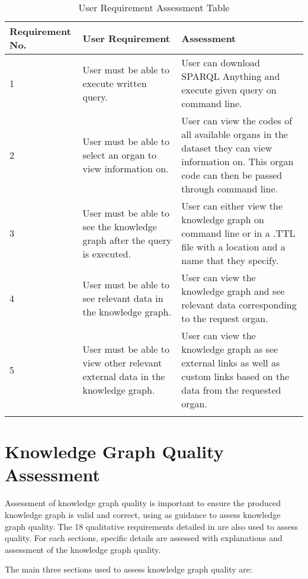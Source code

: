 \begin{longtable}{|p{2.25cm}|p{4.5cm}|p{6.5cm}|}
\hline
\textbf{Requirement No.} & \textbf{User Requirement} & \textbf{Assessment}\\
\hline

1& 
User must be able to execute written query. &
User can download SPARQL Anything and execute given query on command line. \\
\hline

2&
User must be able to select an organ to view information on. &
User can view the codes of all available organs in the dataset they can view information on. This organ code can then be passed through command line. \\
\hline

3&
User must be able to see the knowledge graph after the query is executed. &
User can either view the knowledge graph on command line or in a .TTL file with a location and a name that they specify. \\
\hline

4&
User must be able to see relevant data in the knowledge graph. &
User can view the knowledge graph and see relevant data corresponding to the request organ. \\
\hline

5&
User must be able to view other relevant external data in the knowledge graph. &
User can view the knowledge graph as see external links as well as custom links based on the data from the requested organ. \\ 
\hline

\caption{User Requirement Assessment Table}
\end{longtable}
\vspace{-1.1cm}

\section{Knowledge Graph Quality Assessment}
\hspace{0.5cm} Assessment of knowledge graph quality is important to ensure the produced knowledge graph is valid and correct, using \cite{knowledgegraphevaulationbook} as guidance to assess knowledge graph quality. The 18 qualitative requirements detailed in \cite{evaluationpaper} are also used to assess quality. For each sections, specific details are assessed with explanations and assessment of the knowledge graph quality. 

The main three sections used to assess knowledge graph quality are: 

